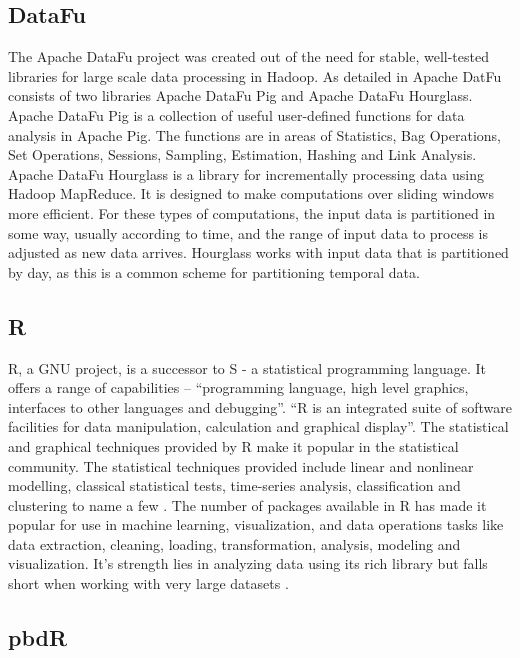 \subsection{DataFu}

    The Apache DataFu project was created out of the need for stable,
    well-tested libraries for large scale data processing in Hadoop.
    As detailed in \cite{www-DataFu} Apache DatFu consists of two
    libraries Apache DataFu Pig and Apache DataFu Hourglass.  Apache
    DataFu Pig is a collection of useful user-defined functions for
    data analysis in Apache Pig. The functions are in areas of
    Statistics, Bag Operations, Set Operations, Sessions, Sampling,
    Estimation, Hashing and Link Analysis.  Apache DataFu Hourglass is
    a library for incrementally processing data using Hadoop
    MapReduce. It is designed to make computations over sliding windows
    more efficient. For these types of computations, the input data is
    partitioned in some way, usually according to time, and the range
    of input data to process is adjusted as new data arrives.
    Hourglass works with input data that is partitioned by day, as
    this is a common scheme for partitioning temporal data.

\subsection{R}

    R, a GNU project, is a successor to S - a statistical programming
    language. It offers a range of capabilities – ``programming
    language, high level graphics, interfaces to other languages and
    debugging''. ``R is an integrated suite of software facilities for
    data manipulation, calculation and graphical display''. The
    statistical and graphical techniques provided by R make it popular
    in the statistical community. The statistical techniques provided
    include linear and nonlinear modelling, classical statistical
    tests, time-series analysis, classification and clustering to name
    a few \cite{www-R}. The number of packages available in R has
    made it popular for use in machine learning, visualization, and
    data operations tasks like data extraction, cleaning, loading,
    transformation, analysis, modeling and visualization. It's
    strength lies in analyzing data using its rich library but falls
    short when working with very large datasets \cite{book-R}.
    
\subsection{pbdR}

